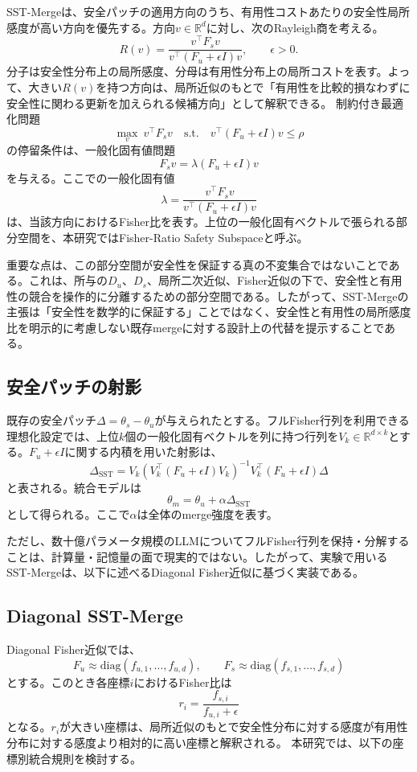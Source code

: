 SST-Mergeは、安全パッチの適用方向のうち、有用性コストあたりの安全性局所感度が高い方向を優先する。方向\(v \in \mathbb{R}^d\)に対し、次のRayleigh商を考える。
\[
R(v)
=
\frac{v^\top F_s v}
{v^\top (F_u+\epsilon I)v},
\qquad \epsilon > 0.
\]
分子は安全性分布上の局所感度、分母は有用性分布上の局所コストを表す。よって、大きい\(R(v)\)を持つ方向は、局所近似のもとで「有用性を比較的損なわずに安全性に関わる更新を加えられる候補方向」として解釈できる。
制約付き最適化問題
\[
\max_v \ v^\top F_s v
\quad
\mathrm{s.t.}
\quad
v^\top(F_u+\epsilon I)v \leq \rho
\]
の停留条件は、一般化固有値問題
\[
F_s v
=
\lambda(F_u+\epsilon I)v
\]
を与える。ここでの一般化固有値
\[
\lambda
=
\frac{v^\top F_s v}
{v^\top(F_u+\epsilon I)v}
\]
は、当該方向におけるFisher比を表す。上位の一般化固有ベクトルで張られる部分空間を、本研究ではFisher-Ratio Safety Subspaceと呼ぶ。

重要な点は、この部分空間が安全性を保証する真の不変集合ではないことである。これは、所与の\(D_u\)、\(D_s\)、局所二次近似、Fisher近似の下で、安全性と有用性の競合を操作的に分離するための部分空間である。したがって、SST-Mergeの主張は「安全性を数学的に保証する」ことではなく、安全性と有用性の局所感度比を明示的に考慮しない既存mergeに対する設計上の代替を提示することである。

\subsection{安全パッチの射影}

既存の安全パッチ\(\Delta=\theta_s-\theta_u\)が与えられたとする。フルFisher行列を利用できる理想化設定では、上位\(k\)個の一般化固有ベクトルを列に持つ行列を\(V_k \in \mathbb{R}^{d\times k}\)とする。\(F_u+\epsilon I\)に関する内積を用いた射影は、
\[
\Delta_{\mathrm{SST}}
=
V_k
\left(
V_k^\top(F_u+\epsilon I)V_k
\right)^{-1}
V_k^\top(F_u+\epsilon I)\Delta
\]
と表される。統合モデルは
\[
\theta_m
=
\theta_u+\alpha\Delta_{\mathrm{SST}}
\]
として得られる。ここで\(\alpha\)は全体のmerge強度を表す。

ただし、数十億パラメータ規模のLLMについてフルFisher行列を保持・分解することは、計算量・記憶量の面で現実的ではない。したがって、実験で用いるSST-Mergeは、以下に述べるDiagonal Fisher近似に基づく実装である。

\subsection{Diagonal SST-Merge}

Diagonal Fisher近似では、
\[
F_u \approx
\mathrm{diag}(f_{u,1},\ldots,f_{u,d}),
\qquad
F_s \approx
\mathrm{diag}(f_{s,1},\ldots,f_{s,d})
\]
とする。このとき各座標\(i\)におけるFisher比は
\[
r_i
=
\frac{f_{s,i}}{f_{u,i}+\epsilon}
\]
となる。\(r_i\)が大きい座標は、局所近似のもとで安全性分布に対する感度が有用性分布に対する感度より相対的に高い座標と解釈される。
本研究では、以下の座標別統合規則を検討する。

